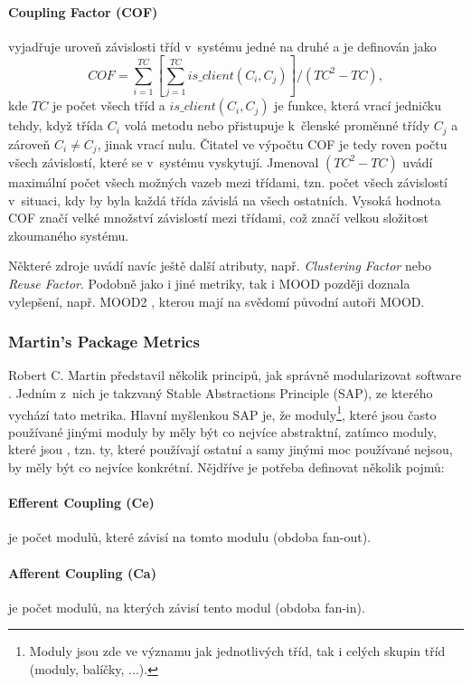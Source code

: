 \documentclass[11pt,twoside,a4paper]{book}
\begin{document}
\paragraph{Coupling Factor (COF)} vyjadřuje uroveň závislosti tříd v~systému jedné na druhé a je definován jako
$$COF = \sum_{i=1}^{TC}{\left[\sum_{j=1}^{TC}{is\_client(C_i, C_j)}\right]} / (TC^2 - TC),$$
kde $TC$ je počet všech tříd a $is\_client(C_i, C_j)$ je funkce, která vrací jedničku tehdy, když třída $C_i$ volá metodu
nebo přistupuje k~členské proměnné třídy $C_j$ a zároveň $C_i \neq C_j$, jinak vrací nulu. Čitatel ve výpočtu COF je tedy roven počtu všech závislostí, které
se v~systému vyskytují. Jmenoval $(TC^2 - TC)$ uvádí maximální počet všech možných vazeb mezi třídami, tzn. počet všech závislostí
v~situaci, kdy by byla každá třída závislá na všech ostatních.
Vysoká hodnota COF značí velké množství závislostí mezi třídami, což značí velkou složitost zkoumaného systému.

Některé zdroje \cite{LKaMOODextra} uvádí navíc ještě další atributy, např. \textit{Clustering Factor} nebo \textit{Reuse Factor}.
Podobně jako i jiné metriky, tak i MOOD později doznala vylepšení, např. MOOD2 \cite{MOODtwo}, kterou mají na svědomí původní autoři MOOD.

\subsubsection{Martin's Package Metrics}
Robert C. Martin představil několik principů, jak správně modularizovat software \cite{KOHEZE1_MARTIN}.
Jedním z~nich je takzvaný Stable Abstractions Principle (SAP), ze kterého vychází tato metrika.
Hlavní myšlenkou SAP je, že moduly\footnote{Moduly jsou zde ve významu jak jednotlivých tříd, tak i celých skupin tříd (moduly, balíčky, ...).},
které jsou často používané jinými moduly by měly být co nejvíce abstraktní,
zatímco moduly, které jsou , tzn. ty, které používají ostatní a samy jinými moc používané nejsou,
by měly být co nejvíce konkrétní. Nějdříve je potřeba definovat několik pojmů:

\paragraph{Efferent Coupling (Ce)} je počet modulů, které závisí na tomto modulu (obdoba \mbox{fan-out}).

\paragraph{Afferent Coupling (Ca)} je počet modulů, na kterých závisí tento modul (obdoba fan-in).
\end{document}
